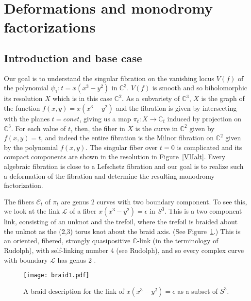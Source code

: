 \documentclass[11pt,letterpaper,reqno]{amsart}
\theoremstyle{remark}
\newcommand{\CC}{{\mathbb C}}
\begin{document}
\section{Deformations and monodromy factorizations}
\label{psik}

\subsection{Introduction and base case}
\label{sec:basecase}

Our goal is to understand the singular fibration on the vanishing locus $V(f)$ of the polynomial $\psi_1: t = x(x^3-y^2)$ in $\CC^3$. $V(f)$ is smooth and so biholomorphic its resolution $X$ which is in this case $\CC^2$. As a subvariety of $\CC^3$, $X$ is the graph of the function $f(x,y) = x(x^3-y^2)$ and the fibration is given by intersecting with the planes $t=\mathit{const}$, giving us a map $\pi_t: X \rightarrow \CC_t$ induced by projection on $\CC^3$. For each value of $t$, then, the fiber in $X$ is the curve in $\CC^2$ given by $f(x,y) = t$, and indeed the entire fibration is the Milnor fibration on $\CC^2$ given by the polynomial $f(x,y)$. The singular fiber over $t=0$ is complicated and its compact components are shown in the resolution in Figure~\ref{VIIalt}. Every algebraic fibration is close to a Lefschetz fibration and our goal is to realize such a deformation of the fibration and determine the resulting monodromy factorization. 

The fibers $\mathcal{C}_t$ of $\pi_t$ are genus 2 curves with two boundary component. To see this, we look at the link $\mathcal{L}$ of a fiber $x(x^3-y^2) = \epsilon$ in $S^3.$ This is a two component link, consisting of an unknot and the trefoil, where the trefoil is braided about the unknot as the (2,3) torus knot about the braid axis. (See Figure~\ref{fig:braid1}.) This is an oriented, fibered, strongly quasipositive $\CC$-link (in the terminology of Rudolph), with self-linking number 4 (see Rudolph), and so every complex curve with boundary $\mathcal{L}$ has genus 2 \cite{Rudolph}.

\begin{figure}
    \centering
    \texttt{[image: braid1.pdf]}
    \caption{A braid description for the link of $x(x^3-y^2) = \epsilon$ as a subset of $S^3$.}
    \label{fig:braid1}
\end{figure} 
\end{document}
